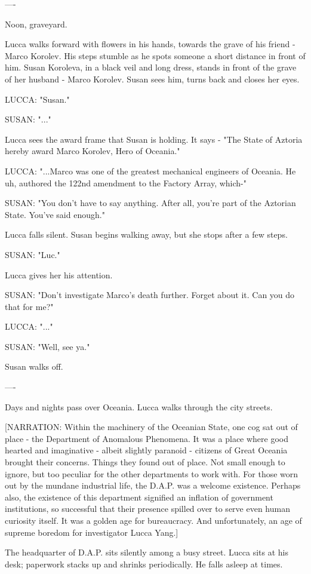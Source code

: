 \documentclass[11pt]{article}
\begin{document}
----

Noon, graveyard. 

Lucca walks forward with flowers in his hands, towards the grave of his friend - Marco Korolev. His steps stumble as he spots someone a short distance in front of him. Susan Koroleva, in a black veil and long dress, stands in front of the grave of her husband - Marco Korolev. Susan sees him, turns back and closes her eyes.

LUCCA: "Susan."

SUSAN: "..."

Lucca sees the award frame that Susan is holding. It says - "The State of Aztoria hereby award Marco Korolev, Hero of Oceania."

LUCCA: "...Marco was one of the greatest mechanical engineers of Oceania.
He uh, authored the 122nd amendment to the Factory Array, which-"

SUSAN: "You don't have to say anything.
After all, you're part of the Aztorian State.
You've said enough."

Lucca falls silent. Susan begins walking away, but she stops after a few steps.

SUSAN: "Luc."

Lucca gives her his attention.

SUSAN: "Don't investigate Marco's death further. 
Forget about it. Can you do that for me?"

LUCCA: "..."

SUSAN: "Well, see ya."

Susan walks off.

----

Days and nights pass over Oceania.
Lucca walks through the city streets.

[NARRATION: Within the machinery of the Oceanian State, one cog sat out of place - the Department of Anomalous Phenomena. 
It was a place where good hearted and imaginative - albeit slightly paranoid - citizens of Great Oceania brought their concerns. Things they found out of place. Not small enough to ignore, but too peculiar for the other departments to work with. 
For those worn out by the mundane industrial life, the D.A.P. was a welcome existence.
Perhaps also, the existence of this department signified an inflation of government institutions, so successful that their presence spilled over to serve even human curiosity itself. 
It was a golden age for bureaucracy. And unfortunately, an age of supreme boredom for investigator Lucca Yang.]

The headquarter of D.A.P. sits silently among a busy street.
Lucca sits at his desk; paperwork stacks up and shrinks periodically.
He falls asleep at times. 
\end{document}
